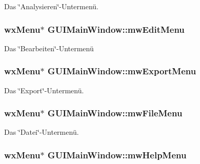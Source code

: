 Das \char`\"{}\-Analysieren\char`\"{}-\/\-Untermenü. \hypertarget{classGUIMainWindow_a32c50be8574176c02aadb47626adc9d4}{
\subsubsection[{mw\-Edit\-Menu}]{\setlength{\rightskip}{0pt plus 5cm}wx\-Menu$\ast$ G\-U\-I\-Main\-Window\-::mw\-Edit\-Menu\hspace{0.3cm}{\ttfamily [private]}}}\label{classGUIMainWindow_a32c50be8574176c02aadb47626adc9d4}
Das \char`\"{}\-Bearbeiten\char`\"{}-\/\-Untermenü \hypertarget{classGUIMainWindow_a9f6af05ef18bf81ff9955670001941ea}{
\subsubsection[{mw\-Export\-Menu}]{\setlength{\rightskip}{0pt plus 5cm}wx\-Menu$\ast$ G\-U\-I\-Main\-Window\-::mw\-Export\-Menu\hspace{0.3cm}{\ttfamily [private]}}}\label{classGUIMainWindow_a9f6af05ef18bf81ff9955670001941ea}
Das \char`\"{}\-Export\char`\"{}-\/\-Untermenü. \hypertarget{classGUIMainWindow_a3b23fa0fb1d779bd5b8384507d8b90e8}{
\subsubsection[{mw\-File\-Menu}]{\setlength{\rightskip}{0pt plus 5cm}wx\-Menu$\ast$ G\-U\-I\-Main\-Window\-::mw\-File\-Menu\hspace{0.3cm}{\ttfamily [private]}}}\label{classGUIMainWindow_a3b23fa0fb1d779bd5b8384507d8b90e8}
Das \char`\"{}\-Datei\char`\"{}-\/\-Untermenü. \hypertarget{classGUIMainWindow_ae8fc1a9ba3768aa042a77b5bea117f6c}{
\subsubsection[{mw\-Help\-Menu}]{\setlength{\rightskip}{0pt plus 5cm}wx\-Menu$\ast$ G\-U\-I\-Main\-Window\-::mw\-Help\-Menu\hspace{0.3cm}{\ttfamily [private]}}}\label{classGUIMainWindow_ae8fc1a9ba3768aa042a77b5bea117f6c}
